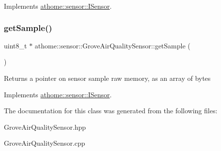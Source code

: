 Implements \mbox{\hyperlink{classathome_1_1sensor_1_1_i_sensor_a95785b54ffe3a8f7e48c81b5732e3b9f}{athome\+::sensor\+::\+I\+Sensor}}.

\mbox{\label{classathome_1_1sensor_1_1_grove_air_quality_sensor_aee12d8cf6439b752c868f75cae298182}} 
\subsubsection{\texorpdfstring{get\+Sample()}{getSample()}}
{\footnotesize\ttfamily uint8\+\_\+t $\ast$ athome\+::sensor\+::\+Grove\+Air\+Quality\+Sensor\+::get\+Sample (\begin{DoxyParamCaption}{ }\end{DoxyParamCaption})\hspace{0.3cm}{\ttfamily [virtual]}}

Returns a pointer on sensor sample raw memory, as an array of bytes 

Implements \mbox{\hyperlink{classathome_1_1sensor_1_1_i_sensor_a2513fd8acc5d8251439330ca0e78cf04}{athome\+::sensor\+::\+I\+Sensor}}.



The documentation for this class was generated from the following files\+:\begin{DoxyCompactItemize}
\item 
Grove\+Air\+Quality\+Sensor.\+hpp\item 
Grove\+Air\+Quality\+Sensor.\+cpp\end{DoxyCompactItemize}
